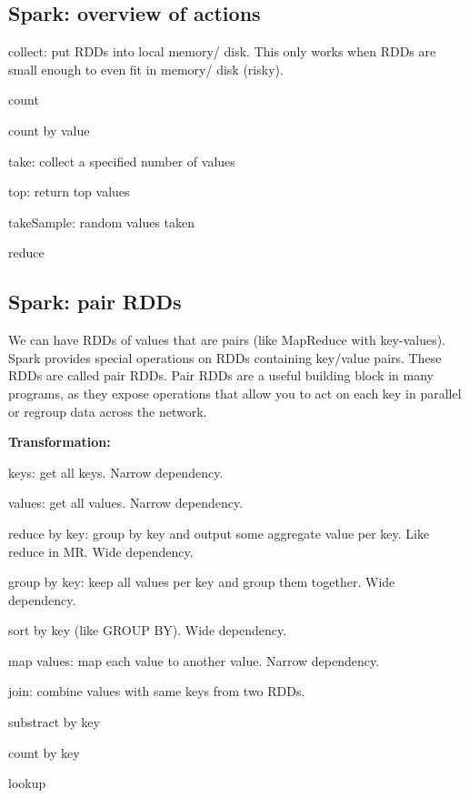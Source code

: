 \documentclass[11pt,oneside,a4paper]{article}
\begin{document}
\newpage

\subsection{Spark: overview of actions}

\begin{compactitem}
\item collect: put RDDs into local memory/ disk. This only works when RDDs are small enough to even fit in memory/ disk (risky).
\item count
\item count by value
\item take: collect a specified number of values
\item top: return top values
\item takeSample: random values taken
\item reduce
\end{compactitem}

\subsection{Spark: pair RDDs}

We can have RDDs of values that are pairs (like MapReduce with key-values). Spark provides special operations on RDDs containing key/value pairs. These RDDs are called pair RDDs. Pair RDDs are a useful building block in many programs, as they expose operations that allow you to act on each key in parallel or regroup data across the network. 

\textbf{Transformation:}

\begin{compactitem}
\item keys: get all keys. Narrow dependency.
\item values: get all values. Narrow dependency.
\item reduce by key: group by key and output some aggregate value per key. Like reduce in MR. Wide dependency.
\item group by key: keep all values per key and group them together. Wide dependency.
\item sort by key (like GROUP BY). Wide dependency.
\item map values: map each value to another value. Narrow dependency.
\item join: combine values with same keys from two RDDs.
\item substract by key
\item count by key
\item lookup
\end{compactitem}
\end{document}
